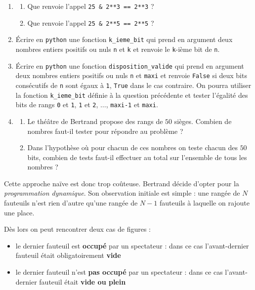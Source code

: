 \documentclass[a4paper, 11pt]{article}
\begin{document}
\begin{enumerate}[resume*]
	\item \begin{enumerate}
		\item Que renvoie l'appel \texttt{25 \& 2**3 == 2**3} ?
		\item Que renvoie l'appel \texttt{25 \& 2**5 == 2**5} ?
	\end{enumerate}
	\item \'Ecrire en \texttt{python} une fonction \texttt{k\_ieme\_bit} qui prend en argument deux nombres entiers positifs ou nuls \texttt{n} et \texttt{k} et renvoie le \texttt{k}-ième bit de \texttt{n}.
	\item \'Ecrire en \texttt{python} une fonction \texttt{disposition\_valide} qui prend en argument deux nombres entiers positifs ou nuls \texttt{n} et \texttt{maxi} et renvoie \texttt{False} si deux bits consécutifs de \texttt{n} sont égaux à \texttt{1}, \texttt{True} dans le cas contraire. On pourra utiliser la fonction \texttt{k\_ieme\_bit} définie à la question précédente et tester l'égalité des bits de rangs \texttt{0} et \texttt{1}, \texttt{1} et \texttt{2}, $\dots$, \texttt{maxi-1} et \texttt{maxi}.
	\item \begin{enumerate}
			\item Le théâtre de Bertrand propose des rangs de $50$ sièges. Combien de nombres faut-il tester pour répondre au problème ?
			\item Dans l'hypothèse où pour chacun de ces nombres on teste chacun des $50$ bits, combien de tests faut-il effectuer au total sur l'ensemble de tous les nombres ?
		\end{enumerate}
\end{enumerate}

\pagebreak
{}

Cette approche naïve est donc trop coûteuse. Bertrand décide d'opter pour la \textit{programmation dynamique}.
Son observation initiale est simple : une rangée de $N$ fauteuils n'est rien d'autre qu'une rangée de $N-1$ fauteuils à laquelle on rajoute une place.

Dès lors on peut rencontrer deux cas de figures :
\begin{itemize}
	\item le dernier fauteuil est \textbf{occupé} par un spectateur : dans ce cas l'avant-dernier fauteuil était obligatoirement \textbf{vide}
	\item le dernier fauteuil n'est \textbf{pas occupé} par un spectateur : dans ce cas l'avant-dernier fauteuil était \textbf{vide ou plein}
\end{itemize}
\end{document}
